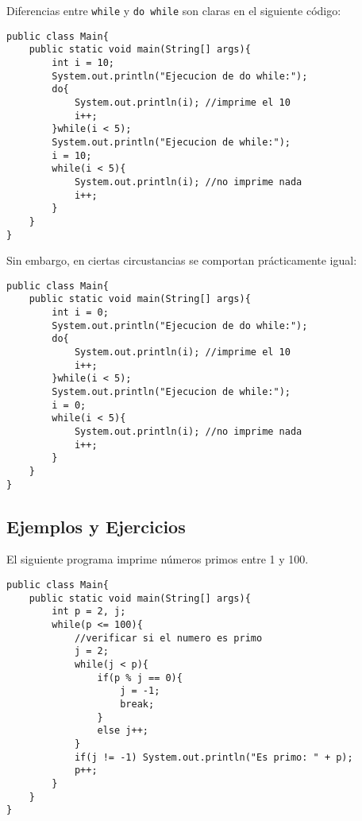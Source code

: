 \documentclass[12pt]{article}
\theoremstyle{largebreak}
\begin{document}
    \begin{obs}
        Diferencias entre \lstinline|while| y \lstinline|do while| son claras en el siguiente código:
        \begin{lstlisting}[caption={Diferente ejecución entre \lstinline|while| y \lstinline|do while|.},label=DescriptiveLabel]
public class Main{
    public static void main(String[] args){
        int i = 10;
        System.out.println("Ejecucion de do while:");
        do{
            System.out.println(i); //imprime el 10
            i++;
        }while(i < 5);
        System.out.println("Ejecucion de while:");
        i = 10;
        while(i < 5){
            System.out.println(i); //no imprime nada
            i++;
        }
    }
}
        \end{lstlisting}
        Sin embargo, en ciertas circustancias se comportan prácticamente igual:
        \begin{lstlisting}[caption={Misma ejecución de \lstinline|while| y \lstinline|do while|.},label=DescriptiveLabel]
public class Main{
    public static void main(String[] args){
        int i = 0;
        System.out.println("Ejecucion de do while:");
        do{
            System.out.println(i); //imprime el 10
            i++;
        }while(i < 5);
        System.out.println("Ejecucion de while:");
        i = 0;
        while(i < 5){
            System.out.println(i); //no imprime nada
            i++;
        }
    }
}
        \end{lstlisting}
    \end{obs}

    \subsection{Ejemplos y Ejercicios}

    \begin{exa}
        El siguiente programa imprime números primos entre 1 y 100.
        \begin{lstlisting}[caption={Programa que imprime números primos entre 1 y 100.},label=DescriptiveLabel]
public class Main{
    public static void main(String[] args){
        int p = 2, j;
        while(p <= 100){
            //verificar si el numero es primo
            j = 2;
            while(j < p){
                if(p % j == 0){
                    j = -1;
                    break;
                }
                else j++;
            }
            if(j != -1) System.out.println("Es primo: " + p);
            p++;
        }
    }
}
        \end{lstlisting}
    \end{exa}
\end{document}

